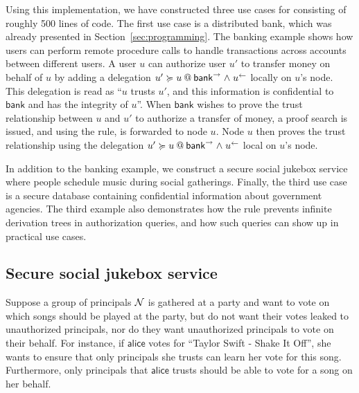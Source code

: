 Using this implementation, we have constructed three use cases for \lang{} consisting of roughly 500 lines of code. The first use case is a distributed bank, which was already presented in Section~\ref{sec:programming}. The banking example shows how users can perform remote procedure calls to handle transactions across accounts between different users. A user $u$ can authorize user $u'$ to transfer money on behalf of $u$ by adding a delegation $\lb{\conf{\mathsf{bank}} \conj \integ{u}}{u' \actsfor u}$ locally on $u$'s node. This delegation is read as ``$u$ trusts $u'$, and this information is confidential to $\mathsf{bank}$ and has the integrity of $u$''. When $\mathsf{bank}$ wishes to prove the trust relationship between $u$ and $u'$ to authorize a transfer of money, a proof search is issued, and using the  rule, is forwarded to node $u$. Node $u$ then proves the trust relationship using the delegation $\lb{\conf{\mathsf{bank}} \conj \integ{u}}{u' \actsfor u}$ local on $u$'s node.

In addition to the banking example, we construct a secure social jukebox service where people schedule music during social gatherings. Finally, the third use case is a secure database containing confidential information about government agencies. The third example also demonstrates how the  rule prevents infinite derivation trees in authorization queries, and how such queries can show up in practical use cases.

\subsection{Secure social jukebox service}\label{subsec:jukebox}
Suppose a group of principals $\Nameset$ is gathered at a party and want to vote on which songs should be played at the party, but do not want their votes leaked to unauthorized principals, nor do they want unauthorized principals to vote on their behalf.
For instance, if $\mathsf{alice}$ votes for ``Taylor Swift - Shake It Off'', she wants to ensure that only principals she trusts can learn her vote for this song. Furthermore, only principals that $\mathsf{alice}$ trusts should be able to vote for a song on her behalf.

